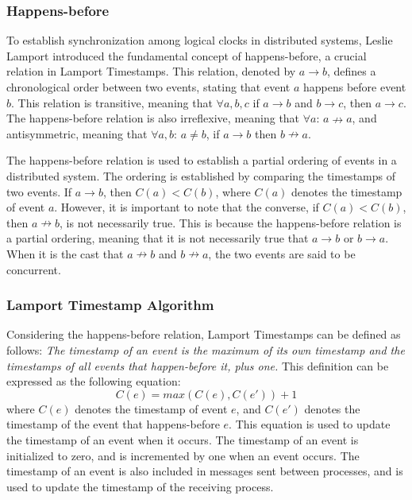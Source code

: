 \documentclass{article}
\begin{document}
  \subsubsection{Happens-before}
    To establish synchronization among logical clocks in distributed systems, Leslie Lamport introduced the fundamental concept of happens-before, a crucial relation in Lamport Timestamps. This relation, denoted by $a \rightarrow b$, defines a chronological order between two events, stating that event $a$ happens before event $b$. This relation is transitive, meaning that \(\forall a,b,c\) if $a \rightarrow b$ and $b \rightarrow c$, then $a \rightarrow c$. The happens-before relation is also irreflexive, meaning that \(\forall a\): $a \nrightarrow a$, and antisymmetric, meaning that \(\forall a,b\): $a \neq b$, if \(a \rightarrow b\) then $b \nrightarrow a$.

    The happens-before relation is used to establish a partial ordering of events in a distributed system. The ordering is established by comparing the timestamps of two events. If $a \rightarrow b$, then $C(a) < C(b)$, where $C(a)$ denotes the timestamp of event $a$. However, it is important to note that the converse, if $C(a) < C(b)$, then $a \nrightarrow b$, is not necessarily true. This is because the happens-before relation is a partial ordering, meaning that it is not necessarily true that $a \rightarrow b$ or $b \rightarrow a$. When it is the cast that $a \nrightarrow b$ and $b \nrightarrow a$, the two events are said to be concurrent.

  \subsubsection{Lamport Timestamp Algorithm}
    Considering the happens-before relation, Lamport Timestamps can be defined as follows: \textit{The timestamp of an event is the maximum of its own timestamp and the timestamps of all events that happen-before it, plus one.} This definition can be expressed as the following equation:
    \begin{equation}
      C(e) = max(C(e), C(e')) + 1
    \end{equation}
    where $C(e)$ denotes the timestamp of event $e$, and $C(e')$ denotes the timestamp of the event that happens-before $e$. This equation is used to update the timestamp of an event when it occurs. The timestamp of an event is initialized to zero, and is incremented by one when an event occurs. The timestamp of an event is also included in messages sent between processes, and is used to update the timestamp of the receiving process.
\end{document}
